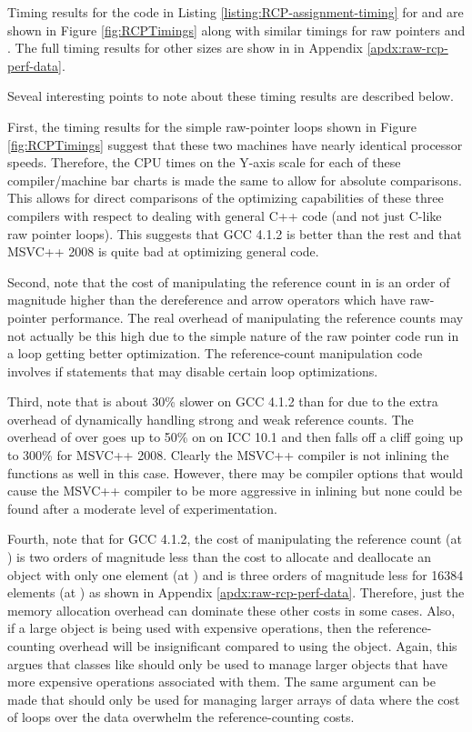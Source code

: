 \documentclass[pdf,ps2pdf,11pt]{SANDreport}
\begin{document}
Timing results for the code in Listing
{}\ref{listing:RCP-assignment-timing} for
{} and {} are
shown in Figure {}\ref{fig:RCPTimings} along with similar timings for
raw pointers and {}.  The full timing
results for other sizes are show in in Appendix
{}\ref{apdx:raw-rcp-perf-data}.

Seveal interesting points to note about these timing results are
described below.

First, the timing results for the simple raw-pointer loops shown in
Figure {}\ref{fig:RCPTimings} suggest that these two machines have
nearly identical processor speeds.  Therefore, the CPU times on the
Y-axis scale for each of these compiler/machine bar charts is made the
same to allow for absolute comparisons.  This allows for direct
comparisons of the optimizing capabilities of these three compilers
with respect to dealing with general C++ code (and not just C-like raw
pointer loops).  This suggests that GCC 4.1.2 is better than the rest
and that MSVC++ 2008 is quite bad at optimizing general {}
code.

Second, note that the cost of manipulating the reference count in
{} is an order of magnitude higher than
the dereference and arrow operators which have raw-pointer
performance.  The real overhead of manipulating the reference counts
may not actually be this high due to the simple nature of the raw
pointer code run in a loop getting better optimization.  The
reference-count manipulation code involves if statements that may
disable certain loop optimizations.

Third, note that {} is about 30\% slower on
GCC 4.1.2 than for {} due to the extra
overhead of dynamically handling strong and weak reference counts.
The overhead of {} over {} goes up to
50\% on on ICC 10.1 and then falls off a cliff going up to 300\% for
MSVC++ 2008.  Clearly the MSVC++ compiler is not inlining the
{} functions as well in this case.  However, there may be
compiler options that would cause the MSVC++ compiler to be more
aggressive in inlining but none could be found after a moderate level
of experimentation.

Fourth, note that for GCC 4.1.2, the cost of manipulating the
reference count (at {}) is two orders of magnitude
less than the cost to allocate and deallocate an
{} object with only one element (at
{}) and is three orders of magnitude less for 16384
elements (at {}) as shown in Appendix
{}\ref{apdx:raw-rcp-perf-data}.  Therefore, just the memory allocation
overhead can dominate these other costs in some cases.  Also, if a
large object is being used with expensive operations, then the
reference-counting overhead will be insignificant compared to using
the object.  Again, this argues that classes like {} should
only be used to manage larger objects that have more expensive
operations associated with them.  The same argument can be made that
{} should only be used for managing larger arrays of
data where the cost of loops over the data overwhelm the
reference-counting costs.
\end{document}
